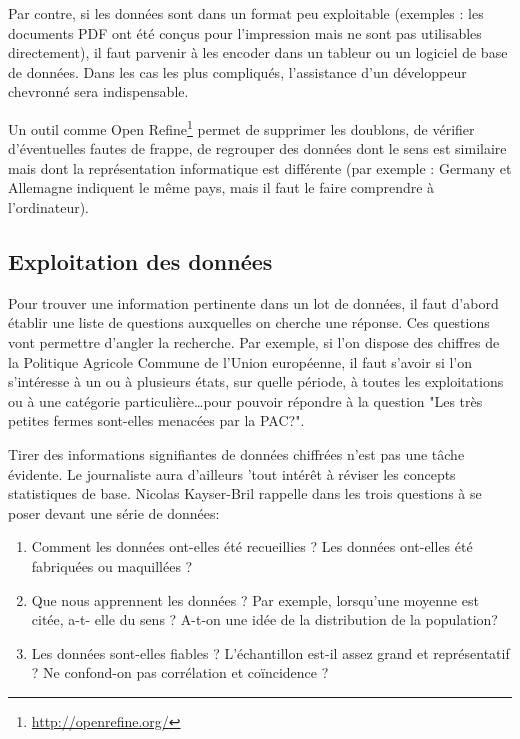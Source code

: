 Par contre, si les données sont dans un format peu exploitable (exemples : les
documents PDF ont été conçus pour l'impression mais ne sont pas utilisables
directement), il faut parvenir à les encoder dans un tableur ou un logiciel 
de base de données. Dans les cas les plus compliqués, l'assistance d'un 
développeur chevronné sera indispensable.

Un outil comme Open Refine\footnote{\url{http://openrefine.org/}} permet de
supprimer les doublons, de vérifier d'éventuelles fautes de frappe, de regrouper
des données dont le sens est similaire mais dont la représentation informatique
est différente (par exemple : \og Germany \fg et \og Allemagne \fg indiquent le même 
pays, mais il faut le faire comprendre à l'ordinateur).

\subsection{Exploitation des données}

Pour trouver une information pertinente dans un lot de données, il faut d'abord établir
une liste de questions auxquelles on cherche une réponse. Ces questions vont permettre d'angler la recherche. Par exemple, si l'on dispose des chiffres de la Politique Agricole Commune de l'Union européenne, il faut s'avoir si l'on s'intéresse à un ou à plusieurs états, sur quelle période, à toutes les exploitations ou à une catégorie particulière\dots pour pouvoir répondre à la question "Les très petites fermes sont-elles menacées par la PAC?".

Tirer des informations signifiantes de données chiffrées n'est pas une tâche 
évidente. Le journaliste aura d'ailleurs 'tout intérêt à réviser les concepts statistiques de base. 
Nicolas Kayser-Bril rappelle dans \cite{handbookfr} les trois questions à se poser 
devant une série de données:

\begin{enumerate}
\item Comment les données ont-elles été recueillies ? Les données ont-elles été 
fabriquées ou maquillées ? 
\item Que nous apprennent les données ? Par exemple, lorsqu'une moyenne est citée, a-t-
elle du sens ? A-t-on une idée de la distribution de la population?
\item Les données sont-elles fiables ? L'échantillon est-il assez grand et 
représentatif ? Ne confond-on pas corrélation et coïncidence ?
\end{enumerate}

